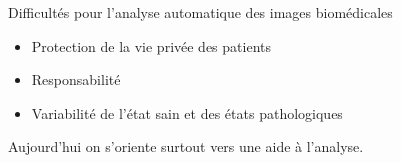 \documentclass[xcolor=pdftex,dvipsnames,table,mathserif]{beamer}
\begin{document}
\begin{frame}{Difficultés pour l'analyse automatique des images biomédicales}

  \begin{itemize}[<+->]
  \item Protection de la vie privée des patients
  \item Responsabilité
  \item Variabilité de l'état sain et des états pathologiques
  \end{itemize}

\pause

  \begin{block}{}
    Aujourd'hui on s'oriente surtout vers une \alert{aide} à l'analyse.
  \end{block}

\end{frame}
\end{document}
